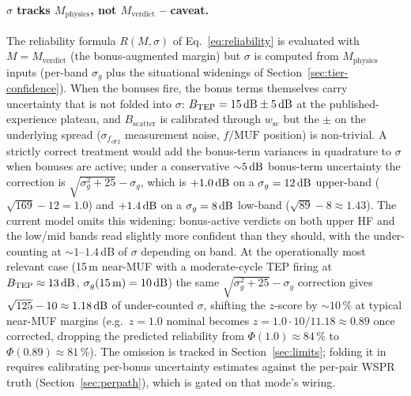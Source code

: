 \documentclass[11pt,a4paper]{article}
\newcommand{\SI}[2]{#1\,\text{#2}}
\newcommand{\si}[1]{\text{#1}}
\newcommand{\dB}{\text{dB}}
\begin{document}
\paragraph{$\sigma$ tracks $M_{\text{physics}}$, not
$M_{\text{verdict}}$ -- caveat.}  The reliability formula
$R(M, \sigma)$ of Eq.~\ref{eq:reliability} is evaluated with
$M = M_{\text{verdict}}$ (the bonus-augmented margin) but $\sigma$
is computed from $M_{\text{physics}}$ inputs (per-band $\sigma_g$
plus the situational widenings of Section~\ref{sec:tier-confidence}).
When the bonuses fire, the bonus terms themselves carry uncertainty
that is not folded into $\sigma$: $B_{\text{TEP}} = 15\,\si{\dB}
\pm \SI{5}{\dB}$ at the published-experience plateau, and
$B_{\text{scatter}}$ is calibrated through
$w_{\text{sc}}$ but the $\pm$ on the underlying spread
($\sigma_{f_{\text{oF2}}}$ measurement noise, $f/\text{MUF}$
position) is non-trivial.  A strictly correct treatment would add
the bonus-term variances in quadrature to $\sigma$ when bonuses
are active; under a conservative ${\sim}\SI{5}{\dB}$ bonus-term
uncertainty the correction is $\sqrt{\sigma_g^2 + 25} - \sigma_g$,
which is $+\SI{1.0}{\dB}$ on a $\sigma_g = \SI{12}{\dB}$ upper-band
($\sqrt{169} - 12 = 1.0$) and $+\SI{1.4}{\dB}$ on a
$\sigma_g = \SI{8}{\dB}$ low-band ($\sqrt{89} - 8 \approx 1.43$).
The current model omits this widening: bonus-active verdicts on
both upper HF and the low/mid bands read slightly more confident
than they should, with the under-counting at ${\sim}1$--$1.4$\,dB
of $\sigma$ depending on band.  At the operationally most
relevant case (15\,m near-MUF with a moderate-cycle TEP firing
at $B_{\text{TEP}} \approx \SI{13}{\dB}$, $\sigma_g(\text{15\,m}) =
\SI{10}{\dB}$) the same $\sqrt{\sigma_g^2 + 25} - \sigma_g$
correction gives $\sqrt{125} - 10 \approx \SI{1.18}{\dB}$ of
under-counted $\sigma$, shifting the $z$-score by
${\sim}\!10\,\%$ at typical near-MUF margins (e.g.\ $z = 1.0$
nominal becomes $z = 1.0 \cdot 10/11.18 \approx 0.89$ once
corrected, dropping the predicted reliability from
$\Phi(1.0) \approx 84\,\%$ to $\Phi(0.89) \approx 81\,\%$).  The omission is
tracked in Section~\ref{sec:limits}; folding it in requires
calibrating per-bonus uncertainty estimates against the per-pair
WSPR truth (Section~\ref{sec:perpath}), which is gated on that
mode's wiring.
\end{document}
